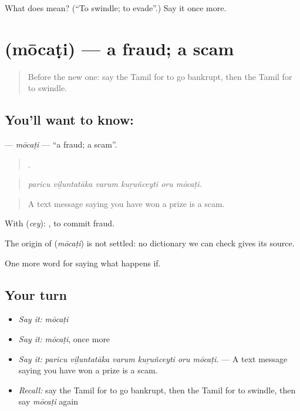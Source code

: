 \begin{tcolorbox}[breakable,colback=teal!4,colframe=teal!35!black,title={Before you move on}]
What does  mean? (\textquotedblleft{}To swindle; to evade\textquotedblright{}.) Say it once more.
\end{tcolorbox}
\section[\texorpdfstring{\ta{மோசடி} (mōcaṭi)}{மோசடி (mōcaṭi)}]{ (mōcaṭi) — a fraud; a scam}

\label{lesson:TA-C548-mocati}



\begin{quote}
Before the new one: say the Tamil for to go bankrupt, then the Tamil for to swindle.
\end{quote}

\subsection*{You'll want to know: }
\textbf{} — \emph{mōcaṭi} — \textquotedblleft{}a fraud; a scam\textquotedblright{}.

\begin{quote}
     .
\end{quote}

\begin{quote}
\emph{paricu viḻuntatāka varum kuṟuñceyti oru mōcaṭi.}
\end{quote}

\begin{quote}
A text message saying you have won a prize is a scam.
\end{quote}

With  (\emph{cey}):  , to commit fraud.

\begin{cousinweb}
The origin of \textbf{} (\emph{mōcaṭi}) is not settled: no dictionary we can check gives its source.
\end{cousinweb}

\begin{grammarlens}[title={What you've built}]
One more word for saying what happens if.
\end{grammarlens}

\subsection*{Your turn}
\begin{itemize}
\raggedright
  \item \emph{Say it:} \emph{mōcaṭi}
  \item \emph{Say it:} \emph{mōcaṭi}, once more
  \item \emph{Say it:} \emph{paricu viḻuntatāka varum kuṟuñceyti oru mōcaṭi.} — A text message saying you have won a prize is a scam.
  \item \emph{Recall:} say the Tamil for to go bankrupt, then the Tamil for to swindle, then say \emph{mōcaṭi} again
\end{itemize}

